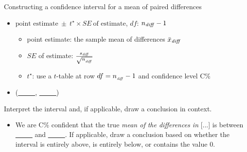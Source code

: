 \begin{onebox}{Constructing a confidence interval for a mean of paired differences}
\begin{itemize}
\item[] $\text{point estimate}\ \pm\ t^{\star} \times SE\ \text{of estimate}$, \quad $df$: $n_{\text{\emph{diff}}} - 1$
\begin{itemize}
\item[] point estimate: the sample mean of differences $\bar{x}_{\text{\emph{diff}}}$
\item[] $SE$ of estimate:  $\frac{s_{\text{\emph{diff}}}}{\sqrt{n_{_\text{\emph{diff}}}}}$
\item[] $t^{\star}$: use a $t$-table at row $df = n_{_\text{\emph{diff}}} - 1$ and confidence level C\%
\end{itemize}
\item[] (\underline{\ \ \ \ \ }, \underline{\ \ \ \ \ })
\end{itemize}
 Interpret the interval and, if applicable, draw a conclusion in context.\vspace{-1mm}
\begin{itemize}
\item[] We are C\%  confident that the true \emph{mean of the differences in} [...] is between \underline{\ \ \ \ \ } and  \underline{\ \ \ \ \ }. If applicable, draw a conclusion based on whether the interval is entirely above, is entirely below, or contains the value 0. 
\end{itemize}\end{onebox}

